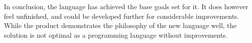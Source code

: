 In conclusion, the language has achieved the base goals set for it. It does however feel unfinished, and could be developed further for considerable improvements. While the product demonstrates the philosophy of the new language well, the solution is not optimal as a programming language without improvements.\\
